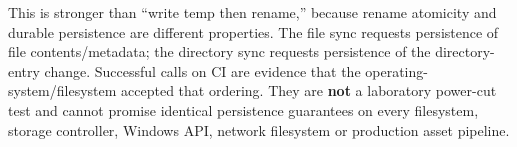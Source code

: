 This is stronger than ``write temp then rename,'' because rename atomicity and durable persistence are different properties. The file sync requests persistence of file contents/metadata; the directory sync requests persistence of the directory-entry change. Successful calls on CI are evidence that the operating-system/filesystem accepted that ordering. They are \textbf{not} a laboratory power-cut test and cannot promise identical persistence guarantees on every filesystem, storage controller, Windows API, network filesystem or production asset pipeline.
